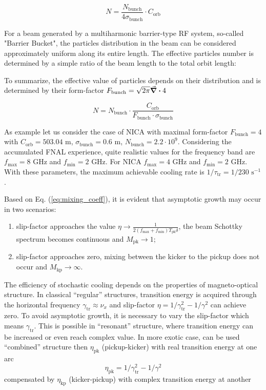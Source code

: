\documentclass[submitting]{nst}
\begin{document}
\begin{equation}
N=\frac{N_{\textrm{bunch}}}{{4\sigma}_{\textrm{bunch}}}\cdot C_{\textrm{orb}}
\end{equation}

\noindent For a beam generated by a multiharmonic barrier-type RF system, so-called "Barrier Bucket", the particles distribution in the beam can be considered approximately uniform along its entire length. The effective particles number is determined by a simple ratio of the beam length to the total orbit length:

\noindent To summarize, the effective value of particles depends on their distribution and is determined by their form-factor $F_{\text{bunch}}=\sqrt{2\pi}\divisionsymbol4$

\begin{equation}
N=N_{\textrm{bunch}}\cdot\frac{C_{\textrm{orb}}}{F_{\textrm{bunch}}\cdot\sigma_{\textrm{bunch}}}
\end{equation}

As example let us consider the case of NICA with maximal form-factor $F_{\text{bunch}}=4$ with $C_{\text{orb}}=503.04$ m, $\sigma_{\text{bunch}}=0.6$ m, $N_{\text{bunch}}=2.2\cdot{10}^9$. Considering the accumulated FNAL \cite{b8} experience, quite realistic values for the frequency band are $f_{\text{max}}=8$ GHz and $f_{\text{min}}=2$ GHz. For NICA $f_{\text{max}}=4$ GHz and $f_{\text{min}}=2$ GHz. With these parameters, the maximum achievable cooling rate is $1/\tau_{\text{tr}}=1/230$ $\text{s}^{-1}$.


\par Based on Eq. (\ref{eq:mixing_coeff}), it is evident that asymptotic growth may occur in two scenarios:
\begin{enumerate}
\item slip-factor approaches the value $\eta\rightarrow\frac{1}{2\left(f_{\text{max}}+f_{\text{min}}\right)T_{\text{pk}}\delta}$, the beam Schottky spectrum becomes continuous and $M_{\text{pk}}\rightarrow1$;
\item slip-factor approaches zero, mixing between the kicker to the pickup does not occur and $M_{\text{kp}}\rightarrow\infty$.
\end{enumerate}
\noindent The efficiency of stochastic cooling depends on the properties of magneto-optical structure. In classical “regular” structures, transition energy is acquired through the horizontal frequency $\gamma_{\text{tr}}\approx\nu_x$ and slip-factor $\eta=1/\gamma_{\text{tr}}^2-1/\gamma^2$ can achieve zero. To avoid asymptotic growth, it is necessary to vary the slip-factor which means $\gamma_{\text{tr}}$. This is possible in “resonant” structure, where transition energy can be increased or even reach complex value. In more exotic case, can be used “combined” structure then $\eta_{\text{pk}}$ (pickup-kicker) with real transition energy at one arc
\begin{equation}
\eta_{\textrm{pk}}=1/\gamma_{\textrm{tr}}^2-1/\gamma^2
\label{eq:eta_pk}
\end{equation}
\noindent compensated by $\eta_{\text{kp}}$ (kicker-pickup) with complex transition energy at another
\end{document}
